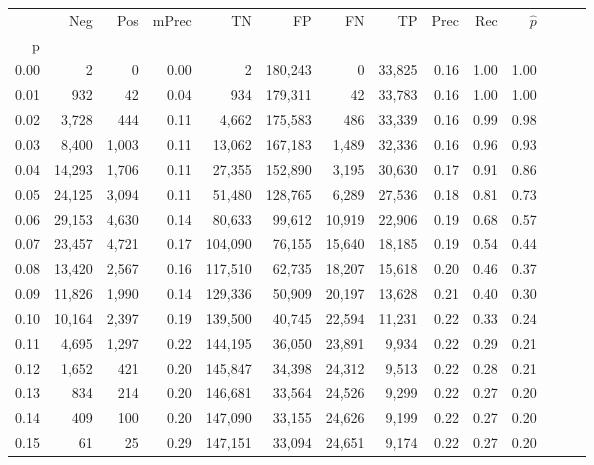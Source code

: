 \begin{tabular}{rrrrrrrrrrrrrr}
\toprule
{} &     Neg &    Pos & mPrec &       TN &       FP &      FN &      TP &  Prec &   Rec & $\hat{p}$ \\
p    &         &        &       &          &          &         &         &       &       &           \\
\midrule
0.00 &       2 &      0 &  0.00 &        2 &  180,243 &       0 &  33,825 &  0.16 &  1.00 &      1.00 \\
0.01 &     932 &     42 &  0.04 &      934 &  179,311 &      42 &  33,783 &  0.16 &  1.00 &      1.00 \\
0.02 &   3,728 &    444 &  0.11 &    4,662 &  175,583 &     486 &  33,339 &  0.16 &  0.99 &      0.98 \\
0.03 &   8,400 &  1,003 &  0.11 &   13,062 &  167,183 &   1,489 &  32,336 &  0.16 &  0.96 &      0.93 \\
0.04 &  14,293 &  1,706 &  0.11 &   27,355 &  152,890 &   3,195 &  30,630 &  0.17 &  0.91 &      0.86 \\
0.05 &  24,125 &  3,094 &  0.11 &   51,480 &  128,765 &   6,289 &  27,536 &  0.18 &  0.81 &      0.73 \\
0.06 &  29,153 &  4,630 &  0.14 &   80,633 &   99,612 &  10,919 &  22,906 &  0.19 &  0.68 &      0.57 \\
0.07 &  23,457 &  4,721 &  0.17 &  104,090 &   76,155 &  15,640 &  18,185 &  0.19 &  0.54 &      0.44 \\
0.08 &  13,420 &  2,567 &  0.16 &  117,510 &   62,735 &  18,207 &  15,618 &  0.20 &  0.46 &      0.37 \\
0.09 &  11,826 &  1,990 &  0.14 &  129,336 &   50,909 &  20,197 &  13,628 &  0.21 &  0.40 &      0.30 \\
0.10 &  10,164 &  2,397 &  0.19 &  139,500 &   40,745 &  22,594 &  11,231 &  0.22 &  0.33 &      0.24 \\
0.11 &   4,695 &  1,297 &  0.22 &  144,195 &   36,050 &  23,891 &   9,934 &  0.22 &  0.29 &      0.21 \\
0.12 &   1,652 &    421 &  0.20 &  145,847 &   34,398 &  24,312 &   9,513 &  0.22 &  0.28 &      0.21 \\
0.13 &     834 &    214 &  0.20 &  146,681 &   33,564 &  24,526 &   9,299 &  0.22 &  0.27 &      0.20 \\
0.14 &     409 &    100 &  0.20 &  147,090 &   33,155 &  24,626 &   9,199 &  0.22 &  0.27 &      0.20 \\
0.15 &      61 &     25 &  0.29 &  147,151 &   33,094 &  24,651 &   9,174 &  0.22 &  0.27 &      0.20 \\

\end{tabular}
